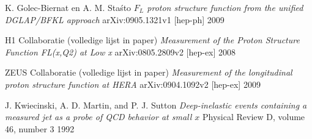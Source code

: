 \documentclass[a4paper,11pt]{article}
\numberwithin{equation}{section} %
\begin{document}
\begin{thebibliography}{99}
  K. Golec-Biernat en A. M. Staśto
  \emph{$F_L$ proton structure function from the unified DGLAP/BFKL approach}
  arXiv:0905.1321v1 [hep-ph]
  2009

  H1 Collaboratie (volledige lijst in paper)
  \emph{Measurement of the Proton Structure Function FL(x,Q2) at Low x}
  arXiv:0805.2809v2 [hep-ex]
  2008

  ZEUS Collaboratie (volledige lijst in paper)
  \emph{Measurement of the longitudinal proton structure function at HERA}
  arXiv:0904.1092v2 [hep-ex]
  2009

  J. Kwiecinski, A. D. Martin, and P. J. Sutton
  \emph{Deep-inelastic events containing a measured jet as a probe of QCD behavior at small $x$}
  Physical Review D, volume 46, number 3
  1992

\end{thebibliography}
\end{document}
